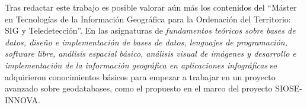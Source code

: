 Tras redactar este trabajo es posible valorar aún más los contenidos del ``Máster en Tecnologías de la Información Geográfica para la Ordenación del Territorio: SIG y Teledetección''. En las asignaturas de \textit{fundamentos teóricos sobre bases de datos, diseño e implementación de bases de datos, lenguajes de programación, software libre, análisis espacial básico, análisis visual de imágenes y desarrollo e implementación de la información geográfica en aplicaciones infográficas} se adquirieron conocimientos básicos para empezar a trabajar en un proyecto avanzado sobre geodatabases, como el propuesto en el marco del proyecto SIOSE-INNOVA.